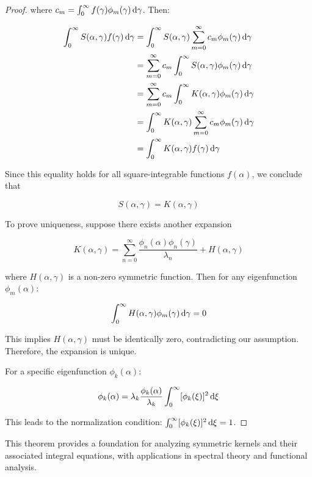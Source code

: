 \begin{proof}
where $c_m = \int_0^\infty f(\gamma) \phi_m(\gamma) \hspace{0.17em} \mathrm{d}\gamma$. Then:

\begin{align}
  \int_0^\infty S(\alpha, \gamma) f(\gamma) \hspace{0.17em} \mathrm{d}\gamma 
  &= \int_0^\infty S(\alpha, \gamma) \sum_{m=0}^{\infty} c_m \phi_m(\gamma) \hspace{0.17em} \mathrm{d}\gamma \\
  &= \sum_{m=0}^{\infty} c_m \int_0^\infty S(\alpha, \gamma) \phi_m(\gamma) \hspace{0.17em} \mathrm{d}\gamma \\
  &= \sum_{m=0}^{\infty} c_m \int_0^\infty K(\alpha, \gamma) \phi_m(\gamma) \hspace{0.17em} \mathrm{d}\gamma \\
  &= \int_0^\infty K(\alpha, \gamma) \sum_{m=0}^{\infty} c_m \phi_m(\gamma) \hspace{0.17em} \mathrm{d}\gamma \\
  &= \int_0^\infty K(\alpha, \gamma) f(\gamma) \hspace{0.17em} \mathrm{d}\gamma
\end{align}

Since this equality holds for all square-integrable functions $f(\alpha)$, we conclude that

\begin{equation}
  S(\alpha, \gamma) = K(\alpha, \gamma)
\end{equation}

To prove uniqueness, suppose there exists another expansion

\begin{equation}
  K(\alpha, \gamma) = \sum_{n=0}^{\infty} \frac{\phi_n(\alpha) \phi_n(\gamma)}{\lambda_n} + H(\alpha, \gamma)
\end{equation}

where $H(\alpha, \gamma)$ is a non-zero symmetric function. Then for any eigenfunction $\phi_m(\alpha)$:

\begin{equation}
  \int_0^\infty H(\alpha, \gamma) \phi_m(\gamma) \hspace{0.17em} \mathrm{d}\gamma = 0
\end{equation}

This implies $H(\alpha, \gamma)$ must be identically zero, contradicting our assumption. Therefore, the expansion is unique.

For a specific eigenfunction $\phi_k(\alpha)$:

\begin{equation}
  \phi_k(\alpha) = \lambda_k \frac{\phi_k(\alpha)}{\lambda_k} \int_0^\infty [\phi_k(\xi)]^2 \hspace{0.17em} \mathrm{d}\xi
\end{equation}

This leads to the normalization condition: $\int_0^\infty [\phi_k(\xi)]^2 \hspace{0.17em} \mathrm{d}\xi = 1$.
\end{proof}

This theorem provides a foundation for analyzing symmetric kernels and their associated integral equations, with applications in spectral theory and functional analysis.
